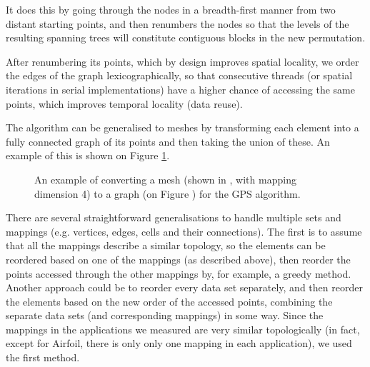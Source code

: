 It does this by going through the nodes in a breadth-first manner from two
distant starting points, and then renumbers the nodes so that the levels of the
resulting spanning trees will constitute contiguous blocks in the new
permutation.

After renumbering its points, which by design improves spatial locality, we
order the edges of the graph lexicographically, so that consecutive threads (or
spatial iterations in serial implementations) have a higher chance of accessing
the same points, which improves temporal locality (data reuse).

The algorithm can be generalised to meshes by transforming each element into a
fully connected graph of its points and then taking the union of these. An
example of this is shown on Figure \ref{fig:mesh2graph}.

\begin{figure}%
  \centering%
  \qquad
  \caption[]{An example of converting a mesh (shown in ,
  with mapping dimension 4) to a graph (on Figure ) for
  the GPS algorithm.}%
  \label{fig:mesh2graph}
\end{figure}

There are several straightforward generalisations to handle multiple sets and
mappings (e.g. vertices, edges, cells and their connections).  The first is to
assume that all the mappings describe a similar topology, so the elements can be
reordered based on one of the mappings (as described above), then reorder the
points accessed through the other mappings by, for example, a greedy method.
Another approach could be to reorder every data set separately, and then reorder
the elements based on the new order of the accessed points, combining the
separate data sets (and corresponding mappings) in some way. Since the mappings
in the applications we measured are very similar topologically (in fact, except
for Airfoil, there is only only one mapping in each application), we used the
first method.

